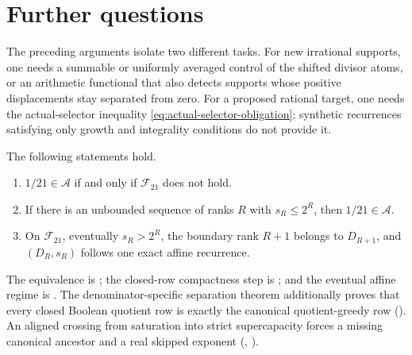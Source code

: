 \documentclass[11pt]{article}
\newcommand{\Ach}{\mathcal A}
\begin{document}
\section{Further questions}\label{sec:open}
The preceding arguments isolate two different tasks.  For new irrational
supports, one needs a summable or uniformly averaged control of the
shifted divisor atoms, or an arithmetic functional that also detects
supports whose positive displacements stay separated from zero.
For a proposed rational target, one needs the actual-selector inequality
\eqref{eq:actual-selector-obligation}; synthetic recurrences satisfying
only growth and integrality conditions do not provide it.

\begin{theorem}
\label{res:one-over-twenty-one-frontier}
The following statements hold.
\begin{enumerate}
\item $1/21\in\Ach$ if and only if $\mathcal F_{21}$ does not hold.
\item If there is an unbounded sequence of ranks $R$ with $s_R\le 2^R$,
  then $1/21\in\Ach$.
\item On $\mathcal F_{21}$, eventually $s_R>2^R$, the boundary rank $R+1$
  belongs to $D_{R+1}$, and $(D_R,s_R)$ follows one exact affine recurrence.
\end{enumerate}
\end{theorem}

\noindent The equivalence is
;
the closed-row compactness step is
;
and the eventual affine regime is
.
The denominator-specific separation theorem additionally proves that every
closed Boolean quotient row is exactly the canonical quotient-greedy row
().
An aligned crossing from saturation into strict supercapacity forces a
missing canonical ancestor and a real skipped exponent
(,
).
\end{document}
